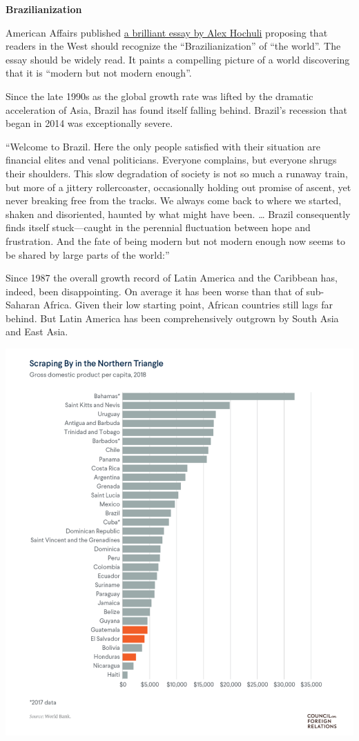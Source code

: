 \documentclass[
]{book}
\begin{document}
\textbf{Brazilianization}

American Affairs published \href{https://americanaffairsjournal.org/2021/05/the-brazilianization-of-the-world/}{a brilliant essay by Alex Hochuli} proposing that readers in the West should recognize the ``Brazilianization'' of ``the world''. The essay should be widely read. It paints a compelling picture of a world discovering that it is ``modern but not modern enough''.

Since the late 1990s as the global growth rate was lifted by the dramatic acceleration of Asia, Brazil has found itself falling behind. Brazil's recession that began in 2014 was exceptionally severe.

``Welcome to Brazil. Here the only people satisfied with their situation are financial elites and venal politicians. Everyone complains, but everyone shrugs their shoulders. This slow degradation of society is not so much a runaway train, but more of a jittery rollercoaster, occasionally holding out promise of ascent, yet never break­ing free from the tracks. We always come back to where we started, shaken and disoriented, haunted by what might have been. \ldots{} Brazil consequently finds itself stuck---caught in the perennial fluctuation between hope and frustration. And the fate of being modern but not modern enough now seems to be shared by large parts of the world:''

Since 1987 the overall growth record of Latin America and the Caribbean has, indeed, been disappointing. On average it has been worse than that of sub-Saharan Africa. Given their low starting point, African countries still lags far behind. But Latin America has been comprehensively outgrown by South Asia and East Asia.

\includegraphics{fig/gdp_cap_central_america_caribbean.png}
\end{document}
